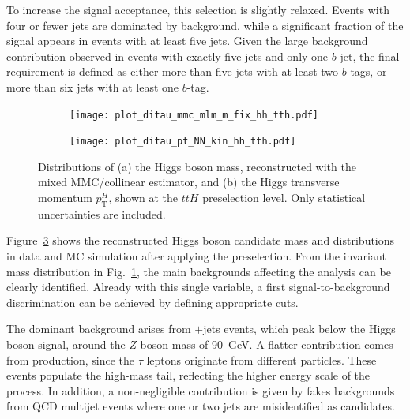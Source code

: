 To increase the signal acceptance, this selection is slightly relaxed. Events with four or fewer jets are dominated by background, while a significant fraction of the signal appears in events with at least five jets. 
Given the large background contribution observed in events with exactly five jets and only one $b$-jet, the final requirement is defined as either more than five jets with at least two $b$-tags, or more than six jets with at least one $b$-tag.

\begin{figure}[htbp]
    \centering
    \begin{subfigure}[b]{0.48\textwidth}
        \centering
        \texttt{[image: plot\_ditau\_mmc\_mlm\_m\_fix\_hh\_tth.pdf]}
        \caption{}
        \label{reconstructed_preselection_a}
    \end{subfigure}
    \hfill
    \begin{subfigure}[b]{0.48\textwidth}
        \centering
        \texttt{[image: plot\_ditau\_pt\_NN\_kin\_hh\_tth.pdf]}
        \caption{}
        \label{reconstructed_preselection_b}
    \end{subfigure}
    \caption{Distributions of (a) the Higgs boson mass, reconstructed with the mixed MMC/collinear estimator, and (b) the Higgs transverse momentum $p_{\text{T}}^H$, shown at the $t\bar{t}H$ preselection level. Only statistical uncertainties are included.}
    \label{reconstructed_preselection}
\end{figure}


Figure~\ref{reconstructed_preselection} shows the reconstructed Higgs boson candidate mass and \pth distributions in data and MC simulation after applying the preselection. 
From the invariant mass distribution in Fig.~\ref{reconstructed_preselection_a}, the main backgrounds affecting the analysis can be clearly identified. 
Already with this single variable, a first signal-to-background discrimination can be achieved by defining appropriate cuts. 

The dominant background arises from \ztautau$+$jets events, which peak below the Higgs boson signal, around the $Z$ boson mass of 90~GeV. 
A flatter contribution comes from \ttbar production, since the $\tau$ leptons originate from different particles. 
These events populate the high-mass tail, reflecting the higher energy scale of the process. In addition, a non-negligible contribution is given by fakes backgrounds from QCD multijet events where one or two jets are misidentified as \tauhadvis candidates. 


